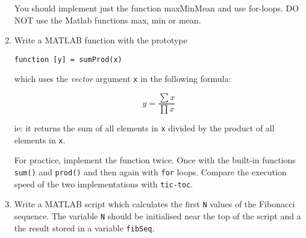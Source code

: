 \documentclass{lab}
\begin{document}
\begin{enumerate}
You should implement just the function maxMinMean and use for-loops. DO NOT use the Matlab functions max, min or mean.

\item Write a MATLAB function with the prototype
\begin{lstlisting}[style=pseudo]
function [y] = sumProd(x)
\end{lstlisting}

which uses the \textit{vector} argument \texttt{x} in the following formula:

\begin{equation}
y = \frac{\sum x}{\prod x}
\end{equation}

ie: it returns the sum of all elements in \texttt{x} divided by the product of all elements in \texttt{x}.

For practice, implement the function twice. Once with  the built-in functions \texttt{sum()} and \texttt{prod()} and then again with \texttt{for} loops. Compare the execution speed of the two implementations with \texttt{tic-toc}.

\item Write a MATLAB script which calculates the first \texttt{N} values of the Fibonacci sequence. The variable \texttt{N} should be initialised near the top of the script and a the result stored in a variable \texttt{fibSeq}.

\end{enumerate}
\end{document}
